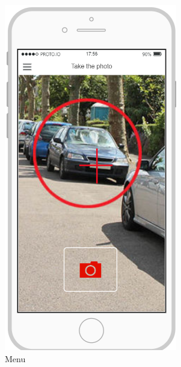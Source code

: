 \documentclass{article}
\begin{document}
\begin{figure}[H]
\begin{subfigure}[H]{0.25\linewidth}
					\includegraphics[width=\linewidth]{Images/Camera.png}
					\caption{Menu}
				\end{subfigure}
				\begin{subfigure}[H]{0.25\linewidth}

\end{subfigure}
\end{figure}
\end{document}
